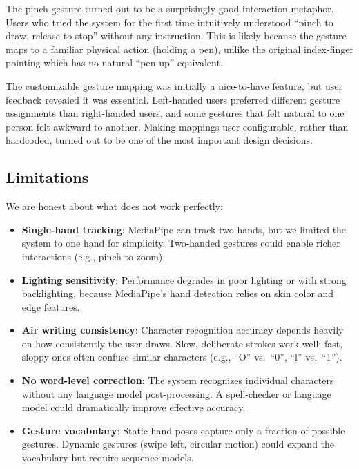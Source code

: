 \documentclass[conference]{IEEEtran}
\begin{document}
The pinch gesture turned out to be a surprisingly good interaction metaphor. Users who tried the system for the first time intuitively understood ``pinch to draw, release to stop'' without any instruction. This is likely because the gesture maps to a familiar physical action (holding a pen), unlike the original index-finger pointing which has no natural ``pen up'' equivalent.

The customizable gesture mapping was initially a nice-to-have feature, but user feedback revealed it was essential. Left-handed users preferred different gesture assignments than right-handed users, and some gestures that felt natural to one person felt awkward to another. Making mappings user-configurable, rather than hardcoded, turned out to be one of the most important design decisions.

\subsection{Limitations}

We are honest about what does not work perfectly:

\begin{itemize}[leftmargin=*]
    \item \textbf{Single-hand tracking}: MediaPipe can track two hands, but we limited the system to one hand for simplicity. Two-handed gestures could enable richer interactions (e.g., pinch-to-zoom).
    \item \textbf{Lighting sensitivity}: Performance degrades in poor lighting or with strong backlighting, because MediaPipe's hand detection relies on skin color and edge features.
    \item \textbf{Air writing consistency}: Character recognition accuracy depends heavily on how consistently the user draws. Slow, deliberate strokes work well; fast, sloppy ones often confuse similar characters (e.g., ``O'' vs.\ ``0'', ``l'' vs.\ ``1'').
    \item \textbf{No word-level correction}: The system recognizes individual characters without any language model post-processing. A spell-checker or language model could dramatically improve effective accuracy.
    \item \textbf{Gesture vocabulary}: Static hand poses capture only a fraction of possible gestures. Dynamic gestures (swipe left, circular motion) could expand the vocabulary but require sequence models.
\end{itemize}
\end{document}
